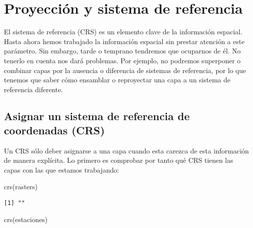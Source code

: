 \documentclass[
  letterpaper,
  DIV=11,
  numbers=noendperiod]{scrreprt}
\newenvironment{Shaded}{\begin{snugshade}}{\end{snugshade}}
\newcommand{\FunctionTok}[1]{\textcolor[rgb]{0.28,0.35,0.67}{#1}}
\newcommand{\NormalTok}[1]{\textcolor[rgb]{0.00,0.23,0.31}{#1}}
\begin{document}
\hypertarget{proyecciuxf3n-y-sistema-de-referencia}{%
\section{Proyección y sistema de
referencia}\label{proyecciuxf3n-y-sistema-de-referencia}}

El sistema de referencia (CRS) es un elemento clave de la información
espacial. Hasta ahora hemos trabajado la información espacial sin
prestar atención a este parámetro. Sin embargo, tarde o temprano
tendremos que ocuparnos de él. No tenerlo en cuenta nos dará problemas.
Por ejemplo, no podremos superponer o combinar capas por la ausencia o
diferencia de sistemas de referencia, por lo que tenemos que saber cómo
ensamblar o reproyectar una capa a un sistema de referencia diferente.

\hypertarget{asignar-un-sistema-de-referencia-de-coordenadas-crs}{%
\subsection{Asignar un sistema de referencia de coordenadas
(CRS)}\label{asignar-un-sistema-de-referencia-de-coordenadas-crs}}

Un CRS sólo deber asignarse a una capa cuando esta carezca de esta
información de manera explícita. Lo primero es comprobar por tanto qué
CRS tienen las capas con las que estamos trabajando:

\begin{Shaded}
\begin{Highlighting}[]
\FunctionTok{crs}\NormalTok{(rasters)}
\end{Highlighting}
\end{Shaded}

\begin{verbatim}
[1] ""
\end{verbatim}

\begin{Shaded}
\begin{Highlighting}[]
\FunctionTok{crs}\NormalTok{(estaciones)}
\end{Highlighting}
\end{Shaded}
\end{document}
